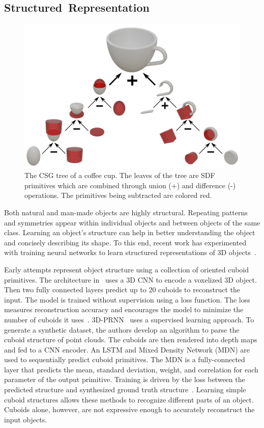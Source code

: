 \newpage


\subsection{Structured~Representation}
\label{subsec:structured_representation}

\begin{figure}[ht]
	\centering
	\includegraphics[scale=0.5]{Images/CSG Cup}
	\caption{The CSG tree of a coffee cup. The leaves of the tree are SDF primitives which are combined through union (+) and difference (-) operations. The primitives being subtracted are colored red.}
	\label{fig:csg_cup}
\end{figure}

Both natural and man-made objects are highly structural. Repeating patterns and symmetries appear within individual objects and between objects of the same class. Learning an object's structure can help in better understanding the object and concisely describing its shape. To this end, recent work has experimented with training neural networks to learn structured representations of 3D objects~\cite{Tulsiani2017}.

Early attempts represent object structure using a collection of oriented cuboid primitives. The architecture in~\cite{Tulsiani2017} uses a 3D CNN to encode a voxelized 3D object. Then two fully connected layers predict up to 20 cuboids to reconstruct the input. The model is trained without supervision using a loss function. The loss measures reconstruction accuracy and encourages the model to minimize the number of cuboids it uses~\cite{Tulsiani2017}. 3D-PRNN~\cite{Zou2017} uses a supervised learning approach. To generate a synthetic dataset, the authors develop an algorithm to parse the cuboid structure of point clouds. The cuboids are then rendered into depth maps and fed to a CNN encoder. An LSTM and Mixed Density Network (MDN) are used to sequentially predict cuboid primitives. The MDN is a fully-connected layer that predicts the mean, standard deviation, weight, and correlation for each parameter of the output primitive. Training is driven by the loss between the predicted structure and synthesized ground truth structure~\cite{Zou2017}. Learning simple cuboid structures allows these methods to recognize different parts of an object. Cuboids alone, however, are not expressive enough to accurately reconstruct the input objects.

